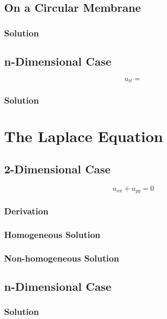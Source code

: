 \documentclass[12pt]{article}
\begin{document}
\subsection{On a Circular Membrane}

\subsubsection{Solution}

\subsection{n-Dimensional Case}

$$u_{tt} = $$

\subsubsection{Solution}


\section{The Laplace Equation}

\subsection{2-Dimensional Case}

$$u_{xx} + u_{yy} = 0$$

\subsubsection{Derivation}

\subsubsection{Homogeneous Solution}

\subsubsection{Non-homogeneous Solution}

\subsection{n-Dimensional Case}

\subsubsection{Solution}
\end{document}
